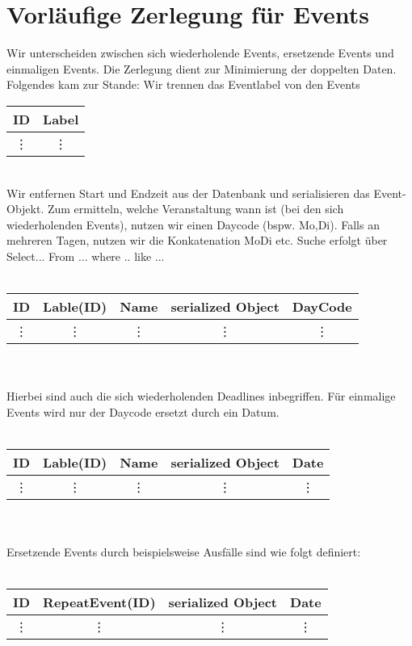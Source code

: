 \documentclass[
a4paper,
twoside,
DIV=12,
BCOR=8mm,
headlineinclude=true,
footinclude=false,
numbers=noenddot,
headheight=40pt, 11pt]{scrartcl}
\begin{document}
 \section{Vorläufige Zerlegung für Events}
 Wir unterscheiden zwischen sich wiederholende Events, ersetzende Events und einmaligen Events. Die Zerlegung dient zur Minimierung der doppelten Daten. Folgendes kam zur Stande: Wir trennen das Eventlabel von den Events\\
 \begin{tabular}{c | c}
 	ID &Label \\
 	\hline \vdots & \vdots
 \end{tabular} \\
Wir entfernen Start und Endzeit aus der Datenbank und serialisieren das Event-Objekt. Zum ermitteln, welche Veranstaltung wann ist (bei den sich wiederholenden Events), nutzen wir einen Daycode (bspw. Mo,Di). Falls an mehreren Tagen, nutzen wir die Konkatenation MoDi etc. Suche erfolgt über Select... From ... where .. like ... \\ \\
\begin{tabular}{c| c |c |c |c}
	\textbf{ID} & \textsf{Lable(ID)} & Name & serialized Object & DayCode \\
	\hline \vdots & \vdots & \vdots &\vdots & \vdots \\
\end{tabular}\\ \\
Hierbei sind auch die sich wiederholenden Deadlines inbegriffen.
Für einmalige Events wird nur der Daycode ersetzt durch ein Datum.\\\\
\begin{tabular}{c| c |c |c |c}
	\textbf{ID} & \textsf{Lable(ID)} & Name & serialized Object & Date \\
	\hline \vdots & \vdots & \vdots &\vdots & \vdots \\
\end{tabular}\\\\
Ersetzende Events durch beispielsweise Ausfälle sind wie folgt definiert:\\\\
\begin{tabular}{c c c c}
		\textbf{ID} & \textsf{RepeatEvent(ID)}& serialized Object & Date \\
	\hline \vdots & \vdots & \vdots &\vdots \\
\end{tabular} \\\\
\end{document}
